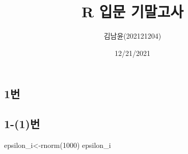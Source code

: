 \documentclass[
  12pt,
]{article}
\title{R 입문 기말고사}
\author{김남윤(202121204)}
\date{12/21/2021}
\newenvironment{Shaded}{\begin{snugshade}}{\end{snugshade}}
\newcommand{\DecValTok}[1]{\textcolor[rgb]{0.00,0.00,0.81}{#1}}
\newcommand{\FunctionTok}[1]{\textcolor[rgb]{0.00,0.00,0.00}{#1}}
\newcommand{\NormalTok}[1]{#1}
\newcommand{\OtherTok}[1]{\textcolor[rgb]{0.56,0.35,0.01}{#1}}
\begin{document}
\maketitle

\hypertarget{uxbc88}{%
\subsection{1번}\label{uxbc88}}

\hypertarget{uxbc88-1}{%
\subsection{1-(1)번}\label{uxbc88-1}}

\begin{Shaded}
\begin{Highlighting}[]
\NormalTok{epsilon\_i}\OtherTok{\textless{}{-}}\FunctionTok{rnorm}\NormalTok{(}\DecValTok{1000}\NormalTok{)}
\NormalTok{epsilon\_i}
\end{Highlighting}
\end{Shaded}
\end{document}
